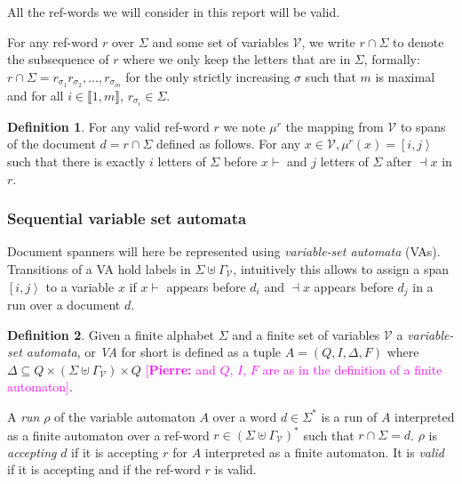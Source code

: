 \documentclass[12px]{article}
\theoremstyle{definition}
\newtheorem{definition}{Definition}
\newcommand{\Span}[1]{\left[ #1 \right\rangle}
\newcommand{\pierre}[1]{\textcolor{magenta}{[\textbf{Pierre:} #1]}}
\begin{document}
        All the ref-words we will consider in this report will be valid.

        For any ref-word $r$ over $\Sigma$ and some set of variables
        $\mathcal{V}$, we write $r \cap \Sigma$ to denote the subsequence
        of $r$
        where we only keep the letters that are in $\Sigma$, formally: $r \cap
        \Sigma = r_{\sigma_1} r_{\sigma_2}, \ldots, r_{\sigma_m}$ for the only
        strictly increasing $\sigma$ such that $m$ is maximal and for all $i
        \in \llbracket 1, m \rrbracket$, $r_{\sigma_i} \in \Sigma$.

        \begin{definition}
          For any valid ref-word $r$ we note $\mu^r$ the mapping from
          $\mathcal{V}$ to spans of the document $d = r \cap \Sigma$ defined as
          follows. For any $x \in \mathcal{V}, \mu^r (x) = \Span{i, j}$ such
          that there is exactly $i$ letters of $\Sigma$ before $x{\vdash}$ and
          $j$ letters of $\Sigma$ after ${\dashv}x$ in $r$.
        \end{definition}

      \subsubsection{Sequential variable set automata}

        Document spanners will here be represented using \textit{variable-set
        automata} (VAs). Transitions of a VA hold labels in $\Sigma \uplus
        \Gamma_\mathcal{V}$, intuitively this allows to assign a span $\Span{i,
        j}$ to a variable $x$ if $x{\vdash}$ appears before $d_i$ and
        ${\dashv}x$ appears before $d_j$ in a run over a document $d$.

        \begin{definition}
          Given a finite alphabet $\Sigma$ and a finite set of variables
          $\mathcal{V}$ a \emph{variable-set automata}, or \emph{VA} for
          short is defined as a tuple $A = (Q, I, \Delta, F)$
          where $\Delta \subseteq Q \times (\Sigma \uplus \Gamma_\mathcal{V})
          \times Q$ \pierre{and $Q$, $I$, $F$ are as in the definition of
          a finite automaton}.

          A \textit{run} $\rho$ of the variable automaton $A$ over a word $d
          \in \Sigma^*$ is a run of $A$ interpreted as a finite automaton over
          a ref-word $r \in {(\Sigma \uplus \Gamma_\mathcal{V})}^*$ such that
          $r \cap \Sigma = d$. $\rho$ is \textit{accepting} $d$ if it is
          accepting $r$ for $A$ interpreted as a finite automaton. It is
          \textit{valid} if it is accepting and if the ref-word $r$ is valid.
        \end{definition}
\end{document}
